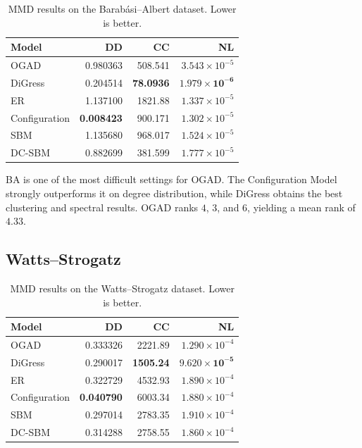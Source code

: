 \begin{table}[htbp]
    \centering
    \caption{MMD results on the Barab\'asi--Albert dataset. Lower is better.}
    \label{tab:exp_ba}
    \begin{tabular}{lrrr}
        \hline
        Model & DD & CC & NL \\
        \hline
        OGAD          & 0.980363 & 508.541 & \(3.543\times10^{-5}\) \\
        DiGress       & 0.204514 & \textbf{78.0936} & \(\mathbf{1.979\times10^{-6}}\) \\
        ER            & 1.137100 & 1821.88 & \(1.337\times10^{-5}\) \\
        Configuration & \textbf{0.008423} & 900.171 & \(1.302\times10^{-5}\) \\
        SBM           & 1.135680 & 968.017 & \(1.524\times10^{-5}\) \\
        DC-SBM        & 0.882699 & 381.599 & \(1.777\times10^{-5}\) \\
        \hline
    \end{tabular}
\end{table}

BA is one of the most difficult settings for OGAD. The Configuration Model strongly outperforms it on degree distribution, while DiGress obtains the best clustering and spectral results. OGAD ranks \(4\), \(3\), and \(6\), yielding a mean rank of \(4.33\).


\subsection{Watts--Strogatz}
\label{subsec:exp_ws}

\begin{table}[htbp]
    \centering
    \caption{MMD results on the Watts--Strogatz dataset. Lower is better.}
    \label{tab:exp_ws}
    \begin{tabular}{lrrr}
        \hline
        Model & DD & CC & NL \\
        \hline
        OGAD          & 0.333326 & 2221.89 & \(1.290\times10^{-4}\) \\
        DiGress       & 0.290017 & \textbf{1505.24} & \(\mathbf{9.620\times10^{-5}}\) \\
        ER            & 0.322729 & 4532.93 & \(1.890\times10^{-4}\) \\
        Configuration & \textbf{0.040790} & 6003.34 & \(1.880\times10^{-4}\) \\
        SBM           & 0.297014 & 2783.35 & \(1.910\times10^{-4}\) \\
        DC-SBM        & 0.314288 & 2758.55 & \(1.860\times10^{-4}\) \\
        \hline
    \end{tabular}
\end{table}

